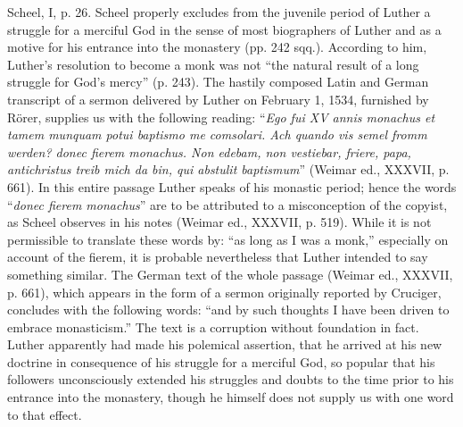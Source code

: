 {Scheel, I, p. 26. Scheel properly excludes from the juvenile period of Luther a struggle
for a merciful God in the sense of most biographers of Luther and as a motive for his
entrance into the monastery (pp. 242 sqq.). According to him, Luther’s resolution to become
a monk was not “the natural result of a long struggle for God’s mercy” (p. 243).
The hastily composed Latin and German transcript of a sermon delivered by Luther on
February 1, 1534, furnished by Rörer, supplies us with the following reading: “\textit{Ego fui XV
annis monachus et tamem munquam potui baptismo me comsolari. Ach quando vis semel
fromm werden? donec fierem monachus. Non edebam, non vestiebar, friere, papa, antichristus
treib mich da bin, qui abstulit baptismum}” (Weimar ed., XXXVII, p. 661). In this entire
passage Luther speaks of his monastic period; hence the words “\textit{donec fierem monachus}”
are to be attributed to a misconception of the copyist, as Scheel observes in his notes
(Weimar ed., XXXVII, p. 519). While it is not permissible to translate these words by: “as
long as I was a monk,” especially on account of the fierem, it is probable nevertheless that
Luther intended to say something similar. The German text of the whole passage (Weimar
ed., XXXVII, p. 661), which appears in the form of a sermon originally reported by
Cruciger, concludes with the following words: “and by such thoughts I have been driven
to embrace monasticism.” The text is a corruption without foundation in fact. Luther apparently
had made his polemical assertion, that he arrived at his new doctrine in consequence
of his struggle for a merciful God, so popular that his followers unconsciously extended
his struggles and doubts to the time prior to his entrance into the monastery, though
he himself does not supply us with one word to that effect.
}

